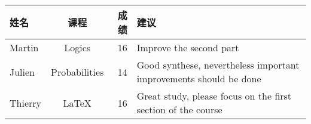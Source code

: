 \documentclass{article}
\begin{document}
\begin{tabular}{|l||c|r|p{4cm}|}
\hline
姓名 & 课程 & 成绩 & 建议 \\
\hline
\hline
Martin & Logics & 16 & Improve the second part \\
\hline
Julien & Probabilities & 14 & Good synthese, nevertheless important improvements should be done\\
\hline
Thierry & \LaTeX{} & 16 & Great study, please focus on the first section of the course\\
\hline
\end{tabular}
\end{document}
